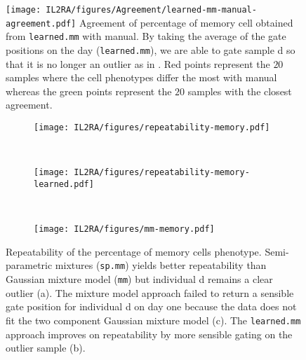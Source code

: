 \begin{figure}[h]
 \centering
 \texttt{[image: IL2RA/figures/Agreement/learned-mm-manual-agreement.pdf]}
 {Agreement of percentage of memory cell obtained from \texttt{learned.mm} with manual.}
 {
 By taking the average of the gate positions on the day (\texttt{learned.mm}), we are able to gate sample d so that it is no longer an outlier
 as in .
 Red points represent the $20$ samples where the cell phenotypes differ the most with manual 
 whereas the green points represent the $20$ samples with the closest agreement.
  }
\end{figure} 

\begin{figure}[h]
\begin{subfigure}[h]{.5\textwidth}
   \texttt{[image: IL2RA/figures/repeatability-memory.pdf]}
   \caption{}
   \label{figure:repeatability-memory}
\end{subfigure}
~
\begin{subfigure}[h]{.5\textwidth}
   \texttt{[image: IL2RA/figures/repeatability-memory-learned.pdf]}
   \caption{}
   \label{figure:repeatability-memory-learned}
\end{subfigure}
~
\begin{subfigure}[h]{\textwidth}
   \texttt{[image: IL2RA/figures/mm-memory.pdf]}
   \caption{}
   \label{figure:mm-memory}
\end{subfigure}
{Repeatability of the percentage of memory cells phenotype.}
{
Semi-parametric mixtures (\texttt{sp.mm}) yields better repeatability than Gaussian mixture model (\texttt{mm}) but individual d remains a clear outlier (a).
The mixture model approach failed to return a sensible gate position for individual d on day one because the data does not fit the two component Gaussian mixture model (c).
The \texttt{learned.mm} approach improves on repeatability by more sensible gating on the outlier sample (b).
}
\end{figure}

